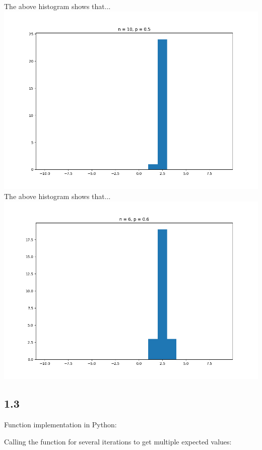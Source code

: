 \documentclass[answers]{exam}
\begin{document}
The above histogram shows that...\\
\includegraphics[scale = 0.7]{Q1_histograms/Q1.2 n = 10, p = 0.5.png}\\
The above histogram shows that...\\
\includegraphics[scale = 0.7]{Q1_histograms/Q1.2 n = 6, p = 0.6.png}

\pagebreak
\subsection*{1.3}
Function implementation in Python:

Calling the function for several iterations to get multiple expected values:

\end{document}
